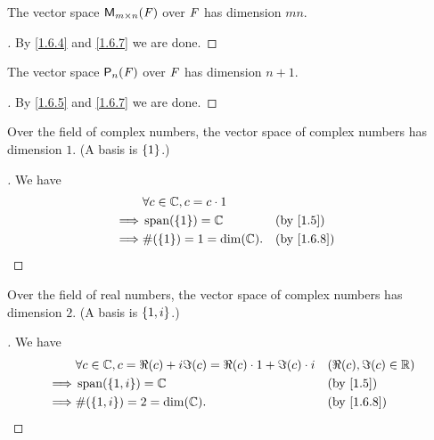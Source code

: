 \begin{eg}\label{1.6.11}
	The vector space \(\mathsf{M}_{{m} \times n}({\mathit{F}})\) over \(\mathit{F}\) has dimension \(mn\).
\end{eg}

\begin{proof}[]
	By \cref{1.6.4} and \cref{1.6.7} we are done.
\end{proof}

\begin{eg}\label{1.6.12}
	The vector space \(\ps[n]{\F}\) over \(\mathit{F}\) has dimension \(n + 1\).
\end{eg}

\begin{proof}[]
	By \cref{1.6.5} and \cref{1.6.7} we are done.
\end{proof}

\begin{eg}\label{1.6.13}
	Over the field of complex numbers, the vector space of complex numbers has dimension \(1\).
	(A basis is \(\left\lbrace1\right\rbrace\).)
\end{eg}

\begin{proof}[]
	We have
	\begin{align*}
		         & \forall c \in \C, c = c \cdot 1                 \\
		\implies & \spn{\set{1}} = \C              &  & \by{1.5}   \\
		\implies & \#\pa{\set{1}} = 1 = \dim(\C).  &  & \by{1.6.8}
	\end{align*}
\end{proof}

\begin{eg}\label{1.6.14}
	Over the field of real numbers, the vector space of complex numbers has dimension \(2\).
	(A basis is \(\left\lbrace1, i\right\rbrace\).)
\end{eg}

\begin{proof}[]
	We have
	\begin{align*}
		         & \forall c \in \C, c = \Re(c) + i \Im(c) = \Re(c) \cdot 1 + \Im(c) \cdot i &  & (\Re(c), \Im(c) \in \R) \\
		\implies & \spn{\set{1, i}} = \C                                                     &  & \by{1.5}                \\
		\implies & \#\pa{\set{1, i}} = 2 = \dim(\C).                                         &  & \by{1.6.8}
	\end{align*}
\end{proof}

